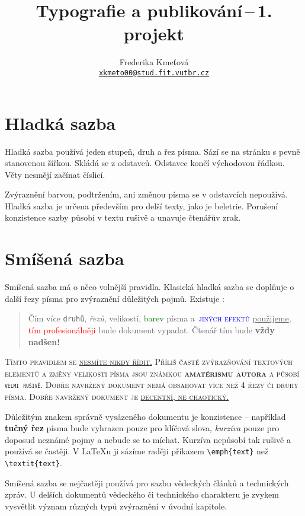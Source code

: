 \documentclass[a4paper, 10pt, twocolumn]{article}
\title{ Typografie a publikování\,--\,1. projekt}
\author{Frederika Kmeťová \\\href{mailto:xkmeto00@stud.fit.vutbr.cz}{\texttt{xkmeto00@stud.fit.vutbr.cz}}}
\date{}
\begin{document}
\maketitle
\section{Hladká sazba}
Hladká sazba používá jeden stupeň, druh a řez písma. Sází
se na stránku s pevně stanovenou šířkou. Skládá se z odstavců. Odstavec končí východovou řádkou. Věty nesmějí
začínat číslicí.
\par
Zvýraznění barvou, podtržením, ani změnou písma se\quad
v odstavcích nepoužívá. Hladká sazba je určena především
pro delší texty, jako je beletrie. Porušení konzistence sazby
působí v textu rušivě a unavuje čtenářův zrak.
\par
\section{\label{sazba}Smíšená sazba}
Smíšená sazba má o něco volnější pravidla. Klasická hladká
sazba se doplňuje o další řezy písma pro zvýraznění důležitých pojmů. Existuje :
\begin{quotation} 
{Čím více \texttt{druhů}, \textit{řezů}, \tiny{velikostí}, \normalsize \textcolor{green}{barev} písma a~\textsc{\textcolor{blue}{jiných efektů}} \underline{použijeme}, \textcolor{red}{tím profesionálněji} bude {\selectfont dokument} vypadat. Čtenář tím bude \Huge{\textbf{vždy nadšen!}}}
\end{quotation}
\par
\scshape Tímto pravidlem se \underline{nesmíte nikdy řídit.}
\normalfont Příliš časté zvýrazňování textových elementů a změny \scriptsize{velikosti} \normalsize písma jsou známkou \textbf{amatérismu autora} a působí \texttt{velmi rušivě}.
Dobře navržený dokument nemá obsahovat více než 4 řezy či druhy písma.
Dobře navržený dokument je \underline{decentní, ne chaotický.}
\par
Důležitým znakem správně vysázeného dokumentu je konzistence -- například \textbf{tučný řez} písma bude vyhrazen pouze pro klíčová slova, \textit{kurzíva} pouze pro doposud neznámé pojmy a nebude se to míchat.
Kurzíva nepůsobí tak rušivě a používá se častěji.
V \LaTeX u ji sázíme raději příkazem \verb|\emph{text}| než \verb|\textit{text}|. 
\par
Smíšená sazba se nejčastěji používá pro sazbu vědeckých článků a technických zpráv.
U delších dokumentů vědeckého či technického charakteru je zvykem vysvětlit význam různých typů zvýraznění v úvodní kapitole.
\end{document}
